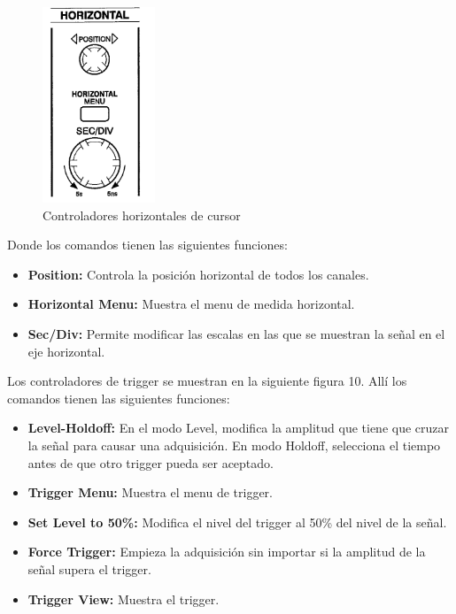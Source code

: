 \documentclass[12pt]{article}
\begin{document}
\begin{figure}[h!]
	\centering
	\includegraphics[width=0.3\textwidth,height=0.25\textheight]{osc-horizontal}
	\caption{Controladores horizontales de cursor}
\end{figure}

Donde los comandos tienen las siguientes funciones:
\begin{itemize}
	\item \textbf{Position:} Controla la posición horizontal de todos los canales.
	\item \textbf{Horizontal Menu:} Muestra el menu de medida horizontal.
	\item \textbf{Sec/Div:} Permite modificar las escalas en las que se muestran la señal en el eje horizontal.
\end{itemize}

Los controladores de trigger se muestran en la siguiente figura 10. Allí los comandos tienen las siguientes funciones:

\begin{itemize}
	\item \textbf{Level-Holdoff:} En el modo Level, modifica la amplitud que tiene que cruzar la señal para causar una adquisición. En modo Holdoff, selecciona el tiempo antes de que otro trigger pueda ser aceptado.
	\item \textbf{Trigger Menu:} Muestra el menu de trigger.
	\item \textbf{Set Level to 50\%:} Modifica el nivel del trigger al 50\% del nivel de la señal.
	\item \textbf{Force Trigger:} Empieza la adquisición sin importar si la amplitud de la señal supera el trigger.
	\item \textbf{Trigger View:} Muestra el trigger.
\end{itemize}
\end{document}
